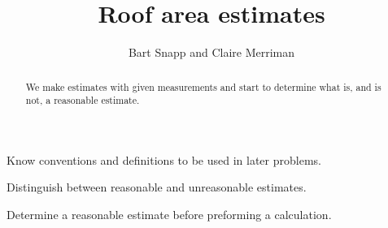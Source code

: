 \documentclass[handout,nooutcomes,noauthor,hints]{ximera}
\title{Roof area estimates}
\author{Bart Snapp and Claire Merriman}
\begin{document}
\begin{abstract}
 We make estimates with given measurements and start to determine what
 is, and is not, a reasonable estimate.
\end{abstract}
\maketitle

\begin{listOutcomes}
\item Know conventions and definitions to be used in later problems.
\item Distinguish between reasonable and unreasonable estimates.
\item Determine a reasonable estimate before preforming a calculation.
\end{listOutcomes}
\end{document}
